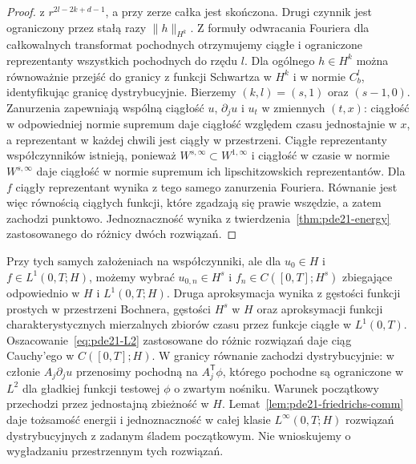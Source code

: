\begin{proof}
z $r^{2l-2k+d-1}$, a przy zerze całka jest skończona.
Drugi czynnik jest ograniczony przez stałą razy
$\|h\|_{H^k}$. Z formuły odwracania Fouriera
dla całkowalnych transformat pochodnych otrzymujemy
ciągłe i ograniczone reprezentanty wszystkich
pochodnych do rzędu $l$. Dla ogólnego $h\in H^k$
można równoważnie przejść do granicy z funkcji
Schwartza w $H^k$ i w normie $C_b^l$,
identyfikując granicę dystrybucyjnie.
Bierzemy $(k,l)=(s,1)$ oraz $(s-1,0)$.
Zanurzenia zapewniają wspólną ciągłość $u$,
$\partial_j u$ i $u_t$ w zmiennych $(t,x)$: ciągłość w odpowiedniej normie
supremum daje ciągłość względem czasu jednostajnie
w $x$, a reprezentant w każdej chwili jest ciągły
w przestrzeni. Ciągłe reprezentanty współczynników istnieją,
ponieważ $W^{s,\infty}\subset W^{1,\infty}$
i ciągłość w czasie w normie $W^{s,\infty}$
daje ciągłość w normie supremum ich lipschitzowskich
reprezentantów. Dla $f$ ciągły reprezentant
wynika z tego samego zanurzenia Fouriera.
Równanie jest więc równością ciągłych funkcji,
które zgadzają się prawie wszędzie, a zatem
zachodzi punktowo.
Jednoznaczność wynika z twierdzenia~\ref{thm:pde21-energy}
zastosowanego do różnicy dwóch rozwiązań.
\end{proof}

\begin{uwaga}
Przy tych samych założeniach na współczynniki, ale
dla $u_0\in H$ i $f\in L^1(0,T;H)$, możemy wybrać
$u_{0,n}\in H^s$ i $f_n\in C([0,T];H^s)$
zbiegające odpowiednio w $H$ i $L^1(0,T;H)$.
Druga aproksymacja wynika z gęstości funkcji prostych
w przestrzeni Bochnera, gęstości $H^s$ w $H$ oraz
aproksymacji funkcji charakterystycznych mierzalnych
zbiorów czasu przez funkcje ciągłe w $L^1(0,T)$.
Oszacowanie~\eqref{eq:pde21-L2} zastosowane do
różnic rozwiązań daje ciąg Cauchy'ego w $C([0,T];H)$.
W granicy równanie zachodzi dystrybucyjnie:
w członie $A_j\partial_j u$ przenosimy pochodną
na $A_j^\mathsf T\phi$, którego pochodne są
ograniczone w $L^2$ dla gładkiej funkcji testowej
$\phi$ o zwartym nośniku.
Warunek początkowy przechodzi przez jednostajną
zbieżność w $H$. Lemat~\ref{lem:pde21-friedrichs-comm}
daje tożsamość energii i jednoznaczność w całej
klasie $L^\infty(0,T;H)$ rozwiązań dystrybucyjnych
z zadanym śladem początkowym. Nie wnioskujemy
o wygładzaniu przestrzennym tych rozwiązań.
\end{uwaga}

